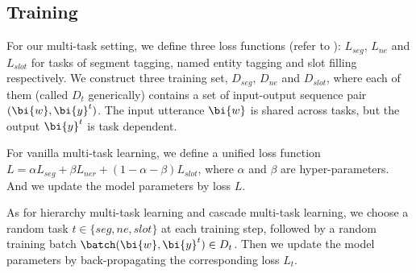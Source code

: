 \subsection{Training}
\label{sec:training}
For our multi-task setting, 
we define three loss functions (refer to ):
$L_{seg}$, $L_{ne}$ and $L_{slot}$ for tasks of segment tagging, named entity tagging 
and slot filling respectively.
We construct three training set,
$D_{seg}$, $D_{ne}$ and $D_{slot}$,
where each of them (called $D_t$ generically) contains a set of 
input-output sequence pair $(\bi{w}, \bi{y}^t)$.
The input utterance $\bi{w}$ is shared across tasks, but the output $\bi{y}^t$ is task dependent.

For vanilla multi-task learning,
we define a unified loss function $L=\alpha L_{seg}+\beta L_{ner}+(1-\alpha-\beta)L_{slot}$, 
where $\alpha$ and $\beta$ are hyper-parameters.
And we update the model parameters by loss $L$.

As for hierarchy multi-task learning and cascade multi-task learning,
we choose a random task $t \in \{seg, ne, slot\}$ at each training step,
followed by a random training batch $\batch(\bi{w}, \bi{y}^t) \in D_t$.
Then we update the model parameters by back-propagating
the corresponding loss $L_t$.
